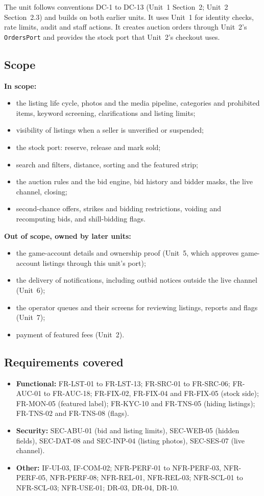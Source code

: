 \documentclass[11pt,a4paper]{article}
\begin{document}
The unit follows conventions DC-1 to DC-13 (Unit~1 Section~2; Unit~2 Section~2.3) and builds on both earlier units. It uses Unit~1 for identity checks, rate limits, audit and staff actions. It creates auction orders through Unit~2's \texttt{OrdersPort} and provides the stock port that Unit~2's checkout uses.

\subsection{Scope}
\textbf{In scope:}
\begin{itemize}[nosep]
  \item the listing life cycle, photos and the media pipeline, categories and prohibited items, keyword screening, clarifications and listing limits;
  \item visibility of listings when a seller is unverified or suspended;
  \item the stock port: reserve, release and mark sold;
  \item search and filters, distance, sorting and the featured strip;
  \item the auction rules and the bid engine, bid history and bidder masks, the live channel, closing;
  \item second-chance offers, strikes and bidding restrictions, voiding and recomputing bids, and shill-bidding flags.
\end{itemize}

\textbf{Out of scope, owned by later units:}
\begin{itemize}[nosep]
  \item the game-account details and ownership proof (Unit~5, which approves game-account listings through this unit's port);
  \item the delivery of notifications, including outbid notices outside the live channel (Unit~6);
  \item the operator queues and their screens for reviewing listings, reports and flags (Unit~7);
  \item payment of featured fees (Unit~2).
\end{itemize}

\subsection{Requirements covered}
\begin{itemize}[nosep]
  \item \textbf{Functional:} FR-LST-01 to FR-LST-13; FR-SRC-01 to FR-SRC-06; FR-AUC-01 to FR-AUC-18; FR-FIX-02, FR-FIX-04 and FR-FIX-05 (stock side); FR-MON-05 (featured label); FR-KYC-10 and FR-TNS-05 (hiding listings); FR-TNS-02 and FR-TNS-08 (flags).
  \item \textbf{Security:} SEC-ABU-01 (bid and listing limits), SEC-WEB-05 (hidden fields), SEC-DAT-08 and SEC-INP-04 (listing photos), SEC-SES-07 (live channel).
  \item \textbf{Other:} IF-UI-03, IF-COM-02; NFR-PERF-01 to NFR-PERF-03, NFR-PERF-05, NFR-PERF-08; NFR-REL-01, NFR-REL-03; NFR-SCL-01 to NFR-SCL-03; NFR-USE-01; DR-03, DR-04, DR-10.
\end{itemize}
\end{document}
